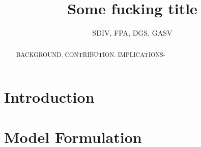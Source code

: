 \documentclass[a4paper,10pt]{amsart}
\begin{document}
    \author{SDIV, FPA, DGS, GASV}
    \title{Some fucking title}
    \maketitle

    \begin{abstract}
    	BACKGROUND.
    	CONTRIBUTION.
    	IMPLICATIONS-
    \end{abstract}

    \section{Introduction}
    \section{Model Formulation}
\end{document}
